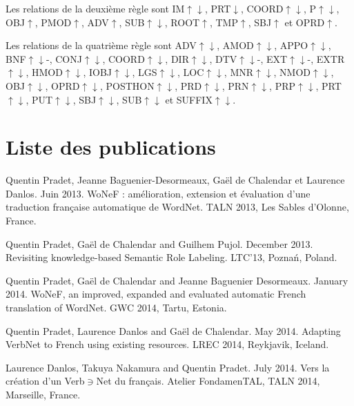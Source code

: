 \documentclass[oneside,parskip,draft]{scrbook}
\begin{document}
Les relations de la deuxième règle sont IM$\uparrow\downarrow$,
PRT$\downarrow$, COORD$\uparrow\downarrow$, P$\uparrow\downarrow$,
OBJ$\uparrow$, PMOD$\uparrow$, ADV$\uparrow$, SUB$\uparrow\downarrow$,
ROOT$\uparrow$, TMP$\uparrow$, SBJ$\uparrow$ et OPRD$\uparrow$.

Les relations de la quatrième règle sont ADV$\uparrow\downarrow$,
AMOD$\uparrow\downarrow$, APPO$\uparrow\downarrow$, BNF$\uparrow\downarrow$-,
CONJ$\uparrow\downarrow$, COORD$\uparrow\downarrow$, DIR$\uparrow\downarrow$,
DTV$\uparrow\downarrow$-, EXT$\uparrow\downarrow$-, EXTR$\uparrow\downarrow$,
HMOD$\uparrow\downarrow$, IOBJ$\uparrow\downarrow$, LGS$\uparrow\downarrow$,
LOC$\uparrow\downarrow$, MNR$\uparrow\downarrow$, NMOD$\uparrow\downarrow$,
OBJ$\uparrow\downarrow$, OPRD$\uparrow\downarrow$, POSTHON$\uparrow\downarrow$,
PRD$\uparrow\downarrow$, PRN$\uparrow\downarrow$, PRP$\uparrow\downarrow$,
PRT$\uparrow\downarrow$, PUT$\uparrow\downarrow$, SBJ$\uparrow\downarrow$,
SUB$\uparrow\downarrow$ et SUFFIX$\uparrow\downarrow$.

\chapter{Liste des publications}

Quentin Pradet, Jeanne Baguenier-Desormeaux, Gaël de Chalendar et Laurence Danlos. Juin 2013. WoNeF : amélioration, extension et évaluation d’une traduction française automatique de WordNet. TALN 2013, Les Sables d'Olonne, France.

Quentin Pradet, Gaël de Chalendar and Guilhem Pujol. December 2013. Revisiting knowledge-based Semantic Role Labeling. LTC'13, Poznań, Poland.

Quentin Pradet, Gaël de Chalendar and Jeanne Baguenier Desormeaux. January 2014. WoNeF, an improved, expanded and evaluated automatic French translation of WordNet. GWC 2014, Tartu, Estonia.

Quentin Pradet, Laurence Danlos and Gaël de Chalendar. May 2014. Adapting VerbNet to French using existing resources. LREC 2014, Reykjavik, Iceland.

Laurence Danlos, Takuya Nakamura and Quentin Pradet. July 2014. Vers la création d’un Verb$\ni$Net du français. Atelier FondamenTAL, TALN 2014, Marseille, France.


\printglossary
\end{document}
